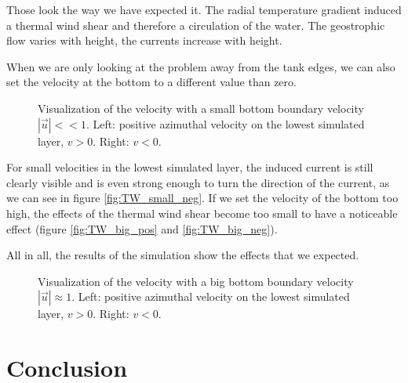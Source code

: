 \documentclass[12pt, a4paper]{article} %
\begin{document}
			Those look the way we have expected it. The radial temperature gradient induced a thermal wind shear and therefore a circulation of the water. The geostrophic flow varies with height, the currents increase with height.
			
			When we are only looking at the problem away from the tank edges, we can also set the velocity  at the bottom to a different value than zero.
			
			\begin{figure}[ht]
				\centering
				\captionsetup{width=0.9\textwidth}
					\qquad
				\caption[Visualization of the velocity with a small bottom boundary velocity]{Visualization of the velocity with a small bottom boundary velocity $|\vec{u}|<<1$. Left: positive azimuthal velocity on the lowest simulated layer, $v>0$. Right: $v<0$.}
			\end{figure}
			
			
			For small velocities in the lowest simulated layer, the induced current is still clearly visible and is even strong enough to turn the direction of the current, as we can see in figure \ref{fig:TW_small_neg}. If we set the velocity of the bottom too high, the effects of the thermal wind shear become too small to have a noticeable effect (figure \ref{fig:TW_big_pos} and \ref{fig:TW_big_neg}).
			
			All in all, the results of the simulation show the effects that we expected. 
			
			\begin{figure}[H]
				\centering
				\captionsetup{width=0.9\textwidth}
					\qquad
				\caption[Visualization of the velocity with a big bottom boundary velocity]{Visualization of the velocity with a big bottom boundary velocity $|\vec{u}| \approx 1$. Left: positive azimuthal velocity on the lowest simulated layer, $v>0$. Right: $v<0$.}
			\end{figure}
	\newpage
\section{Conclusion}
\end{document}
